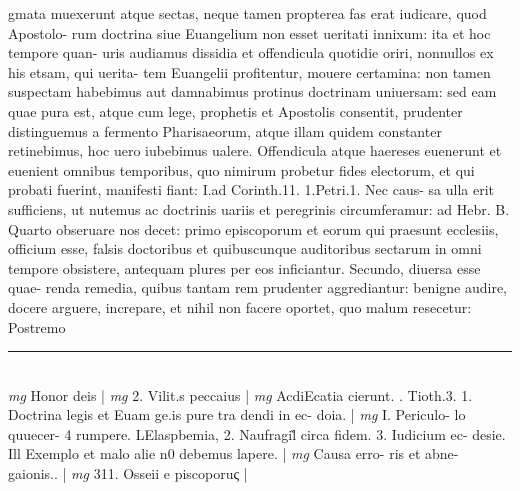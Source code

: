 \documentclass{article}
\begin{document}
\begin{pages}
gmata muexerunt atque  sectas, neque  tamen propterea fas erat iudicare, quod Apostolo- rum doctrina siue Euangelium non esset ueritati innixum: ita et hoc tempore quan- uris audiamus dissidia et offendicula quotidie oriri, nonnullos ex his etsam, qui uerita- tem Euangelii profitentur, mouere certamina: non tamen suspectam habebimus aut damnabimus protinus doctrinam uniuersam: sed eam quae pura est, atque cum lege, prophetis et Apostolis consentit, prudenter distinguemus a fermento Pharisaeorum, atque illam quidem constanter retinebimus, hoc uero iubebimus ualere. Offendicula atque  haereses euenerunt et euenient omnibus  temporibus, quo nimirum probetur fides electorum, et qui probati fuerint, manifesti fiant: I.ad Corinth.11. 1.Petri.1. Nec caus- sa ulla erit sufficiens, ut nutemus ac doctrinis uariis et peregrinis circumferamur: ad Hebr. B. Quarto obseruare nos decet: primo episcoporum et eorum qui praesunt ecclesiis, officium esse, falsis doctoribus et quibuscunque  auditoribus sectarum in omni tempore obsistere, antequam plures per eos inficiantur. Secundo, diuersa esse quae- renda remedia, quibus tantam rem prudenter aggrediantur: benigne audire, docere arguere, increpare, et nihil non facere oportet, quo malum resecetur: Postremo  \pend
\vspace{0.5cm}\noindent
\vspace{0.2cm}\rule{1cm}{0.2pt}\\ 
\hspace{0.2cm}\textit{mg}
\footnotesize Honor deis 
\normalsize| 
\hspace{0.2cm}\textit{mg}
\footnotesize 2. Vilit.s peccaius 
\normalsize| 
\hspace{0.2cm}\textit{mg}
\footnotesize AcdiEcatia cierunt. . Tioth.3. 1. Doctrina legis et Euam ge.is pure tra dendi in ec- doia. 
\normalsize| 
\hspace{0.2cm}\textit{mg}
\footnotesize I. Periculo- lo quuecer- 4 rumpere. LElaspbemia, 2. Naufragil̃ circa fidem. 3. Iudicium ec- desie. Ill Exemplo et malo alie n0 debemus lapere. 
\normalsize| 
\hspace{0.2cm}\textit{mg}
\footnotesize Causa erro- ris et abne- gaionis.. 
\normalsize| 
\hspace{0.2cm}\textit{mg}
\footnotesize 311. Osseii e piscoporuς 
\normalsize| 

\end{pages}
\end{document}
